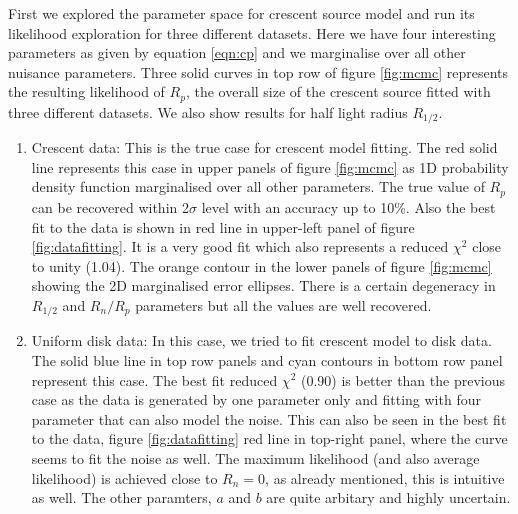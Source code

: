 First we explored the parameter space for crescent source model and run its likelihood exploration for three different datasets. Here we have four interesting parameters as given by equation \ref{eqn:cp} and we marginalise over all other nuisance parameters. Three solid curves in top row of figure \ref{fig:mcmc} represents the resulting likelihood of $R_p$, the overall size of the crescent source fitted with three different datasets. We also show results for half light radius $R_{1/2}$.

\begin{enumerate}

\item Crescent data: This is the true case for crescent model fitting. The red solid line represents this case in upper panels of figure \ref{fig:mcmc} as 1D probability density function marginalised over all other parameters. The true value of $R_p$ can be recovered within 2$\sigma$ level with an accuracy up to 10\%. Also the best fit to the data is shown in red line in upper-left panel of figure \ref{fig:datafitting}. It is a very good fit which also represents a reduced $\chi^2$ close to unity (1.04). The orange contour in the lower panels of figure \ref{fig:mcmc} showing the 2D marginalised error ellipses. There is a certain degeneracy in $R_{1/2}$ and $R_n/R_p$ parameters but all the values are well recovered. 

\item Uniform disk data: In this case, we tried to fit crescent model to disk data. The solid blue line in top row panels and cyan contours in bottom row panel represent this case. The best fit reduced $\chi^2$ (0.90) is better than the previous case as the data is generated by one parameter only and fitting with four parameter that can also model the noise. This can also be seen in the best fit to the data, figure \ref{fig:datafitting} red line in top-right panel, where the curve seems to fit the noise as well. The maximum likelihood (and also average likelihood) is achieved close to $R_n = 0$, as already mentioned, this is intuitive as well. The other paramters, $a$ and $b$ are quite arbitary and highly uncertain. 


\end{enumerate}
